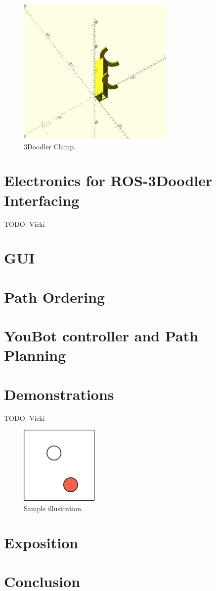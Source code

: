 \documentclass[conference]{acmsiggraph}
\begin{document}
\begin{figure}[ht]
  \centering
  \includegraphics[width=3.0in]{images/clamp.png}
  \caption{3Doodler Clamp.}
  \label{fig:clamp}
\end{figure}


\section{Electronics for ROS-3Doodler Interfacing}
TODO: Vicki

\section{GUI}

\section{Path Ordering}

\section{YouBot controller and Path Planning}

\section{Demonstrations}
TODO: Vicki



\begin{figure}[ht]
  \centering
  \includegraphics[width=1.5in]{images/samplefigure}
  \caption{Sample illustration.}
\end{figure}


\section{Exposition}



\section{Conclusion}






\end{document}
